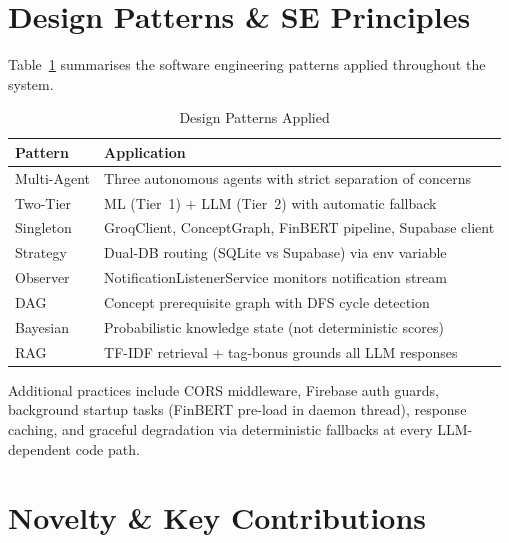 \documentclass[conference]{IEEEtran}
\begin{document}
\section{Design Patterns \& SE Principles}

Table~\ref{tab:patterns} summarises the software engineering patterns applied throughout the system.

\begin{table}[!t]
\centering
\caption{Design Patterns Applied}
\label{tab:patterns}
\renewcommand{\arraystretch}{1.15}
\footnotesize
\begin{tabular}{p{2cm} p{5.2cm}}
\toprule
\textbf{Pattern} & \textbf{Application} \\
\midrule
Multi-Agent   & Three autonomous agents with strict separation of concerns \\
Two-Tier      & ML (Tier~1) + LLM (Tier~2) with automatic fallback \\
Singleton     & GroqClient, ConceptGraph, FinBERT pipeline, Supabase client \\
Strategy      & Dual-DB routing (SQLite vs Supabase) via env variable \\
Observer      & NotificationListenerService monitors notification stream \\
DAG           & Concept prerequisite graph with DFS cycle detection \\
Bayesian      & Probabilistic knowledge state (not deterministic scores) \\
RAG           & TF-IDF retrieval + tag-bonus grounds all LLM responses \\
\bottomrule
\end{tabular}
\end{table}

Additional practices include CORS middleware, Firebase auth guards, background startup tasks (FinBERT pre-load in daemon thread), response caching, and graceful degradation via deterministic fallbacks at every LLM-dependent code path.

\section{Novelty \& Key Contributions}
\end{document}
